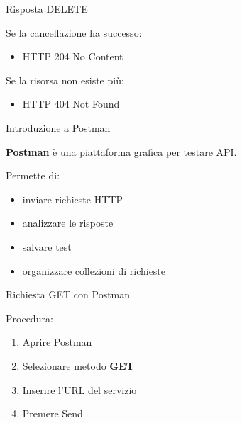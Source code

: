 \documentclass{beamer}
\begin{document}
	
	\begin{frame}{Risposta DELETE}
		
		Se la cancellazione ha successo:
		
		\begin{itemize}
			\item HTTP 204 No Content
		\end{itemize}
		
		Se la risorsa non esiste più:
		
		\begin{itemize}
			\item HTTP 404 Not Found
		\end{itemize}
		
	\end{frame}
	
	
	\begin{frame}{Introduzione a Postman}
		
		\textbf{Postman} è una piattaforma grafica per testare API.
		
		\bigskip
		
		Permette di:
		
		\begin{itemize}
			\item inviare richieste HTTP
			\item analizzare le risposte
			\item salvare test
			\item organizzare collezioni di richieste
		\end{itemize}
		
	\end{frame}
	
	
	\begin{frame}{Richiesta GET con Postman}
		
		Procedura:
		
		\begin{enumerate}
			\item Aprire Postman
			\item Selezionare metodo \textbf{GET}
			\item Inserire l'URL del servizio
			\item Premere Send
		\end{enumerate}
		
	\end{frame}
	
\end{document}
